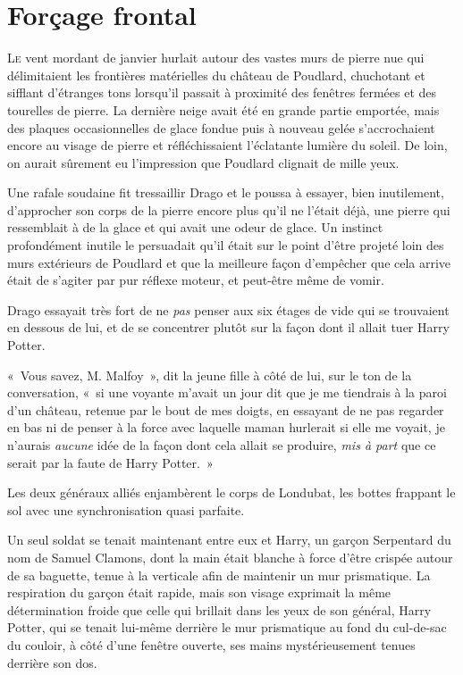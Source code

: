 \chapter{Forçage frontal}

\lettrine{L}{e} vent mordant de janvier hurlait autour des vastes murs de pierre nue qui délimitaient les frontières matérielles du château de Poudlard, chuchotant et sifflant d'étranges tons lorsqu'il passait à proximité des fenêtres fermées et des tourelles de pierre. La dernière neige avait été en grande partie emportée, mais des plaques occasionnelles de glace fondue puis à nouveau gelée s'accrochaient encore au visage de pierre et réfléchissaient l'éclatante lumière du soleil. De loin, on aurait sûrement eu l'impression que Poudlard clignait de mille yeux.

Une rafale soudaine fit tressaillir Drago et le poussa à essayer, bien inutilement, d'approcher son corps de la pierre encore plus qu'il ne l'était déjà, une pierre qui ressemblait à de la glace et qui avait une odeur de glace. Un instinct profondément inutile le persuadait qu'il était sur le point d'être projeté loin des murs extérieurs de Poudlard et que la meilleure façon d'empêcher que cela arrive était de s'agiter par pur réflexe moteur, et peut-être même de vomir.

Drago essayait très fort de ne \emph{pas} penser aux six étages de vide qui se trouvaient en dessous de lui, et de se concentrer plutôt sur la façon dont il allait tuer Harry Potter.

«~Vous savez, M. Malfoy~», dit la jeune fille à côté de lui, sur le ton de la conversation, «~si une voyante m'avait un jour dit que je me tiendrais à la paroi d'un château, retenue par le bout de mes doigts, en essayant de ne pas regarder en bas ni de penser à la force avec laquelle maman hurlerait si elle me voyait, je n'aurais \emph{aucune} idée de la façon dont cela allait se produire, \emph{mis à part} que ce serait par la faute de Harry Potter.~»


Les deux généraux alliés enjambèrent le corps de Londubat, les bottes frappant le sol avec une synchronisation quasi parfaite.

Un seul soldat se tenait maintenant entre eux et Harry, un garçon Serpentard du nom de Samuel Clamons, dont la main était blanche à force d'être crispée autour de sa baguette, tenue à la verticale afin de maintenir un mur prismatique. La respiration du garçon était rapide, mais son visage exprimait la même détermination froide que celle qui brillait dans les yeux de son général, Harry Potter, qui se tenait lui-même derrière le mur prismatique au fond du cul-de-sac du couloir, à côté d'une fenêtre ouverte, ses mains mystérieusement tenues derrière son dos.

